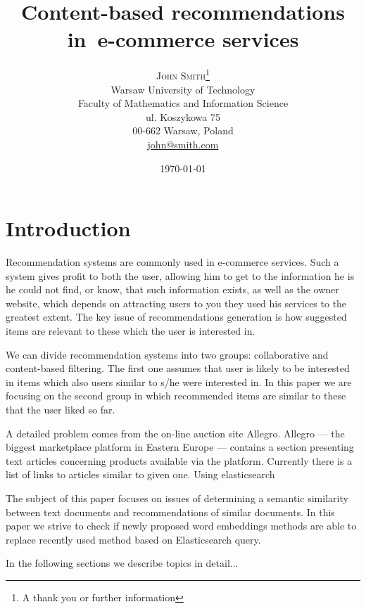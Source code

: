 \documentclass[twoside,twocolumn]{article}
\title{Content-based recommendations in~e-commerce services} %
\author{%
	\textsc{John Smith}\thanks{A thank you or further information} \\[1ex] %
	\normalsize Warsaw University of Technology \\ %
	\normalsize Faculty of Mathematics and Information Science \\
	\normalsize ul. Koszykowa 75 \\
	\normalsize 00-662 Warsaw, Poland \\
	\normalsize \href{mailto:john@smith.com}{john@smith.com} %
}
\date{\today} %
\begin{document}
	
	\maketitle

	\section{Introduction}

	
	
	
	Recommendation systems are commonly used in e-commerce services. Such a system gives profit to both the user, allowing him to get to the information he is
	he could not find, or know, that such information exists, as well as the owner website, which depends on attracting users to you they used his services to the greatest extent. 	The key issue of recommendations generation is how suggested items are relevant to these which the user is interested in. 
	
	We can divide recommendation systems into two groups: collaborative and content-based filtering. The first one assumes that user is likely to be interested in items which also users similar to s/he were interested in. In this paper we are focusing on the second group in which recommended items are similar to these that the user liked so far.
	
	A detailed problem comes from the on-line auction site Allegro. Allegro --- the biggest marketplace platform in Eastern Europe --- contains a section presenting text articles concerning products available via the platform. Currently there is a list of links to articles similar to given one. Using elasticsearch
	
	The subject of this paper focuses on issues of determining a semantic similarity between text
	documents and recommendations of similar documents. In this paper we strive to check if newly proposed word embeddings methods are able to replace recently used method based on Elasticsearch query.%
	
	
	In the following sections we describe topics in detail...
	
\end{document}
